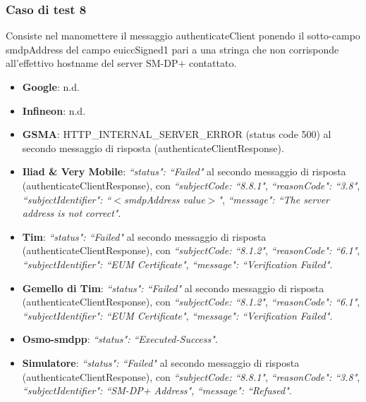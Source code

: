 \documentclass[10pt, oneside]{book}
\begin{document}
\subsubsection{Caso di test 8}
Consiste nel manomettere il messaggio authenticateClient ponendo il sotto-campo smdpAddress del campo euiccSigned1 pari a una stringa che non corrisponde all'effettivo hostname del server SM-DP+ contattato.
\begin{itemize}
\item \textbf{Google}: n.d.
\item \textbf{Infineon}: n.d.
\item \textbf{GSMA}: HTTP\_INTERNAL\_SERVER\_ERROR (status code 500) al secondo messaggio di risposta (authenticateClientResponse).
\item \textbf{Iliad \& Very Mobile}: \textit{``status": ``Failed"} al secondo messaggio di risposta (authenticateClientResponse), con \textit{``subjectCode: ``8.8.1"}, \textit{``reasonCode": ``3.8"}, \textit{``subjectIdentifier": ``$<$smdpAddress value$>$"}, \textit{``message": ``The server address is not correct"}.
\item \textbf{Tim}: \textit{``status": ``Failed"} al secondo messaggio di risposta (authenticateClientResponse), con \textit{``subjectCode: ``8.1.2"}, \textit{``reasonCode": ``6.1"}, \textit{``subjectIdentifier": ``EUM Certificate"}, \textit{``message": ``Verification Failed"}.
\item \textbf{Gemello di Tim}: \textit{``status": ``Failed"} al secondo messaggio di risposta (authenticateClientResponse), con \textit{``subjectCode: ``8.1.2"}, \textit{``reasonCode": ``6.1"}, \textit{``subjectIdentifier": ``EUM Certificate"}, \textit{``message": ``Verification Failed"}.
\item \textbf{Osmo-smdpp}: \textit{``status": ``Executed-Success"}.
\item \textbf{Simulatore}: \textit{``status": ``Failed"} al secondo messaggio di risposta (authenticateClientResponse), con \textit{``subjectCode: ``8.8.1"}, \textit{``reasonCode": ``3.8"}, \textit{``subjectIdentifier": ``SM-DP+ Address"}, \textit{``message": ``Refused"}.
\end{itemize}
\end{document}
